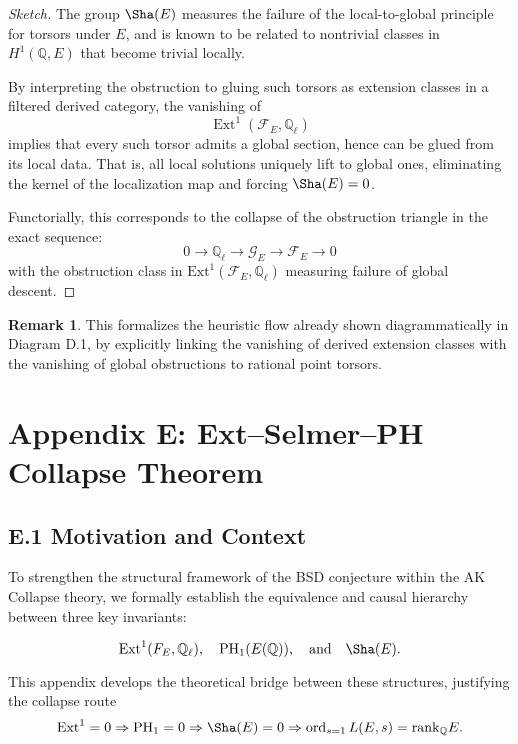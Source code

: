 \documentclass[11pt]{article}
\theoremstyle{definition}
\newtheorem{remark}[theorem]{Remark}
\begin{document}
\begin{proof}[Sketch]
The group \( \Sha(E) \) measures the failure of the local-to-global principle for torsors under \( E \), and is known to be related to nontrivial classes in \( H^1(\mathbb{Q}, E) \) that become trivial locally.

By interpreting the obstruction to gluing such torsors as extension classes in a filtered derived category, the vanishing of
\[
\operatorname{Ext}^1(\mathcal{F}_E, \mathbb{Q}_\ell)
\]
implies that every such torsor admits a global section, hence can be glued from its local data. That is, all local solutions uniquely lift to global ones, eliminating the kernel of the localization map and forcing \( \Sha(E) = 0 \).

Functorially, this corresponds to the collapse of the obstruction triangle in the exact sequence:
\[
0 \to \mathbb{Q}_\ell \to \mathcal{G}_E \to \mathcal{F}_E \to 0
\]
with the obstruction class in \( \mathrm{Ext}^1(\mathcal{F}_E, \mathbb{Q}_\ell) \) measuring failure of global descent.
\end{proof}

\begin{remark}
This formalizes the heuristic flow already shown diagrammatically in Diagram D.1, by explicitly linking the vanishing of derived extension classes with the vanishing of global obstructions to rational point torsors. 
\end{remark}




\section*{Appendix E: Ext--Selmer--PH Collapse Theorem}

\subsection*{E.1 Motivation and Context}

To strengthen the structural framework of the BSD conjecture within the AK Collapse theory,  
we formally establish the equivalence and causal hierarchy between three key invariants:

\[
\mathrm{Ext}^1(F_E, \mathbb{Q}_\ell), \quad \mathrm{PH}_1(E(\mathbb{Q})), \quad \text{and} \quad \Sha(E).
\]

This appendix develops the theoretical bridge between these structures, justifying the collapse route  
\[
\mathrm{Ext}^1 = 0 \Rightarrow \mathrm{PH}_1 = 0 \Rightarrow \Sha(E) = 0 \Rightarrow \operatorname{ord}_{s=1}L(E,s) = \mathrm{rank}_\mathbb{Q}E.
\]
\end{document}
